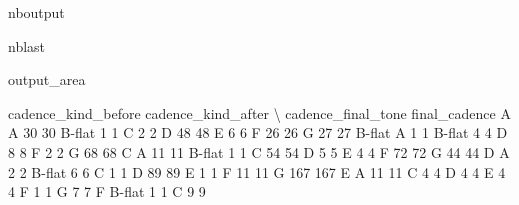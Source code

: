 \documentclass[letterpaper,10pt,english]{sphinxmanual}
\begin{document}
\begin{sphinxuseclass}{nboutput}
\begin{sphinxuseclass}{nblast}
{\begin{sphinxuseclass}{output_area}
\begin{sphinxuseclass}{}
\begin{sphinxVerbatim}[commandchars=\\\{\}]
                                  cadence\_kind\_before  cadence\_kind\_after  \textbackslash{}
cadence\_final\_tone final\_cadence
A                  A                               30                  30
                   B-flat                           1                   1
                   C                                2                   2
                   D                               48                  48
                   E                                6                   6
                   F                               26                  26
                   G                               27                  27
B-flat             A                                1                   1
                   B-flat                           4                   4
                   D                                8                   8
                   F                                2                   2
                   G                               68                  68
C                  A                               11                  11
                   B-flat                           1                   1
                   C                               54                  54
                   D                                5                   5
                   E                                4                   4
                   F                               72                  72
                   G                               44                  44
D                  A                                2                   2
                   B-flat                           6                   6
                   C                                1                   1
                   D                               89                  89
                   E                                1                   1
                   F                               11                  11
                   G                              167                 167
E                  A                               11                  11
                   C                                4                   4
                   D                                4                   4
                   E                                4                   4
                   F                                1                   1
                   G                                7                   7
F                  B-flat                           1                   1
                   C                                9                   9

\end{sphinxVerbatim}
\end{sphinxuseclass}
\end{sphinxuseclass}}
\end{sphinxuseclass}
\end{sphinxuseclass}
\end{document}
